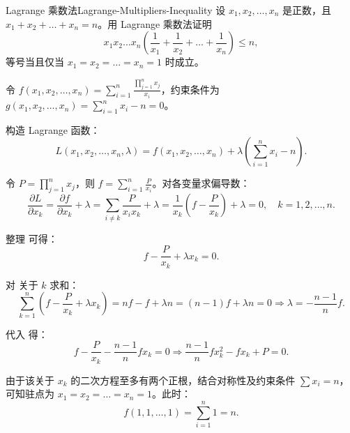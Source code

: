 \begin{problem}{Lagrange 乘数法}{Lagrange-Multipliers-Inequality}
    设 $x_1, x_2, \dots, x_n$ 是正数，且 $x_1 + x_2 + \dots + x_n = n$。用 Lagrange 乘数法证明
    \begin{equation}
        x_1 x_2 \dots x_n \left( \frac{1}{x_1} + \frac{1}{x_2} + \dots + \frac{1}{x_n} \right) \leqslant n,
    \end{equation}
    等号当且仅当 $x_1 = x_2 = \dots = x_n = 1$ 时成立。
\end{problem}

\begin{myproof}
    令 $f(x_1, x_2, \dots, x_n) = \sum_{i=1}^n \frac{\prod_{j=1}^n x_j}{x_i}$，约束条件为 $g(x_1, x_2, \dots, x_n) = \sum_{i=1}^n x_i - n = 0$。

    构造 Lagrange 函数：
    \begin{equation}\label{eq:Lagrange-Function}
        L(x_1, x_2, \dots, x_n, \lambda) = f(x_1, x_2, \dots, x_n) + \lambda \left( \sum_{i=1}^n x_i - n \right).
    \end{equation}

    令 $P = \prod_{j=1}^n x_j$，则 $f = \sum_{i=1}^n \frac{P}{x_i}$。对各变量求偏导数：
    \begin{equation}\label{eq:Partial-Deriv}
        \frac{\partial L}{\partial x_k} = \frac{\partial f}{\partial x_k} + \lambda = \sum_{i \neq k} \frac{P}{x_i x_k} + \lambda = \frac{1}{x_k} \left( f - \frac{P}{x_k} \right) + \lambda = 0, \quad k = 1, 2, \dots, n.
    \end{equation}

    整理  可得：
    \begin{equation}\label{eq:Condition-1}
        f - \frac{P}{x_k} + \lambda x_k = 0.
    \end{equation}

    对  关于 $k$ 求和：
    \begin{equation}
        \sum_{k=1}^n \left( f - \frac{P}{x_k} + \lambda x_k \right) = nf - f + \lambda n = (n-1)f + \lambda n = 0 \Rightarrow \lambda = -\frac{n-1}{n} f.
    \end{equation}

    代入  得：
    \begin{equation}
        f - \frac{P}{x_k} - \frac{n-1}{n} f x_k = 0 \Rightarrow \frac{n-1}{n} f x_k^2 - f x_k + P = 0.
    \end{equation}

    由于该关于 $x_k$ 的二次方程至多有两个正根，结合对称性及约束条件 $\sum x_i = n$，可知驻点为 $x_1 = x_2 = \dots = x_n = 1$。此时：
    \begin{equation}
        f(1, 1, \dots, 1) = \sum_{i=1}^n 1 = n.
    \end{equation}


\end{myproof}
